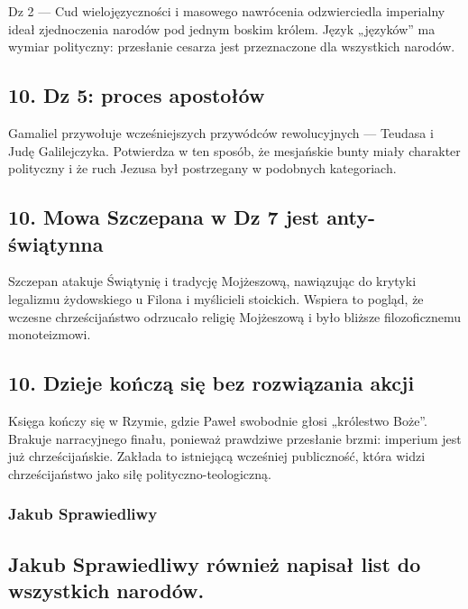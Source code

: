 Dz 2 --- Cud wielojęzyczności i masowego nawrócenia odzwierciedla imperialny ideał zjednoczenia narodów pod jednym boskim królem.
Język „języków” ma wymiar polityczny: przesłanie cesarza jest przeznaczone dla wszystkich narodów.

\subsection{10.
Dz 5: proces apostołów}\label{subsec:acts-5-the-trial-of-the-apostles}

Gamaliel przywołuje wcześniejszych przywódców rewolucyjnych — Teudasa i Judę Galilejczyka.
Potwierdza w ten sposób, że mesjańskie bunty miały charakter polityczny i że ruch Jezusa był postrzegany w podobnych kategoriach.

\subsection{10.
Mowa Szczepana w Dz 7 jest anty-świątynna}\label{subsec:stephens-speech-in-acts-7-is-anti-temple}

Szczepan atakuje Świątynię i tradycję Mojżeszową, nawiązując do krytyki legalizmu żydowskiego u Filona i myślicieli stoickich.
Wspiera to pogląd, że wczesne chrześcijaństwo odrzucało religię Mojżeszową i było bliższe filozoficznemu monoteizmowi.

\subsection{10.
Dzieje kończą się bez rozwiązania akcji}\label{subsec:acts-ends-without-resolution}

Księga kończy się w Rzymie, gdzie Paweł swobodnie głosi „królestwo Boże”.
Brakuje narracyjnego finału, ponieważ prawdziwe przesłanie brzmi: imperium jest już chrześcijańskie.
Zakłada to istniejącą wcześniej publiczność, która widzi chrześcijaństwo jako siłę polityczno-teologiczną.

\subsubsection{Jakub Sprawiedliwy}\label{subsec:james-the-just}

\subsection{Jakub Sprawiedliwy również napisał list do wszystkich narodów.}\label{subsec:james-the-just-also-wrote-an-epistle-to-all-nations.}

